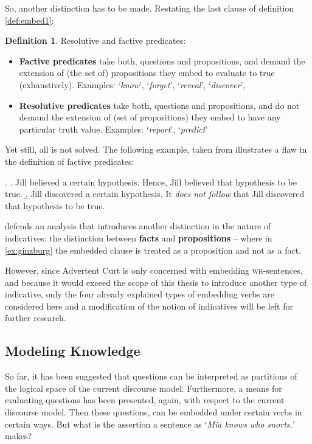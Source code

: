 \documentclass[notitlepage,twoside,a4paper]{scrreprt}
\newcommand{\term}[1]{\textsf{\textbf{#1}}} %
\newcommand{\pn}{\textsf} %
\newcommand{\example}[1]{`\textit{#1}'} %
\newcommand{\wh}{\textsc{wh}}
\newcommand{\acurt}{\pn{Advertent Curt}}
\theoremstyle{remark}
\theoremstyle{remark}
\theoremstyle{definition}
\newtheorem{definition}[thm]{Definition}
\theoremstyle{definition}
\begin{document}
So, another distinction has to be made. Restating the last clause of definition
\ref{def:embed1}:

\begin{definition}\label{def:embed2}
  Resolutive and factive predicates:
  \begin{itemize}
  \item \term{Factive predicates} take both, questions and propositions, and
  demand the extension of (the set of) propositions they embed to evaluate to true (exhaustively).
  Examples:
  \example{know}, \example{forget}, \example{reveal}, \example{discover},
  \item \term{Resolutive predicates} take both, questions and propositions, and
  do not demand the extension of (set of propositions) they embed to have any particular truth value.
  Examples:
  \example{report}, \example{predict}
  \end{itemize}
\end{definition}

Yet still, all is not solved. The following example, taken from \cite[example
(27)]{ginzburg} illustrates a flaw in the definition of factive predicates:

\ex. 
\a. Jill believed a certain hypothesis. Hence, Jill believed that hypothesis
to be true.
\b. \label{ex:ginzburg}Jill discovered a certain hypothesis. It \emph{does not follow} that Jill
discovered that hypothesis to be true. 

\cite{ginzburg} defends an analysis that
introduces another distinction in the nature of indicatives: the distinction
between \term{facts} and \term{propositions} -- where in \ref{ex:ginzburg} the
embedded clause is treated as a proposition and not as a fact.

However, since \acurt{} is only concerned with embedding \wh-sentences, and
because it would exceed the scope of this thesis to introduce another type of
indicative, only the four already explained types of embedding verbs are 
considered here and a modification of the notion of indicatives will be left for
further research.

\subsection{Modeling Knowledge}\label{sec:epistemic}

So far, it has been suggested that questions can be interpreted as partitions of
the logical space of the current discourse model. Furthermore, a means for
evaluating questions has been presented, again, with respect to the current
discourse model. Then these questions, can be embedded under certain verbs in
certain ways. But what is the assertion a sentence as \example{Mia knows who
snorts.} makes?
\end{document}
